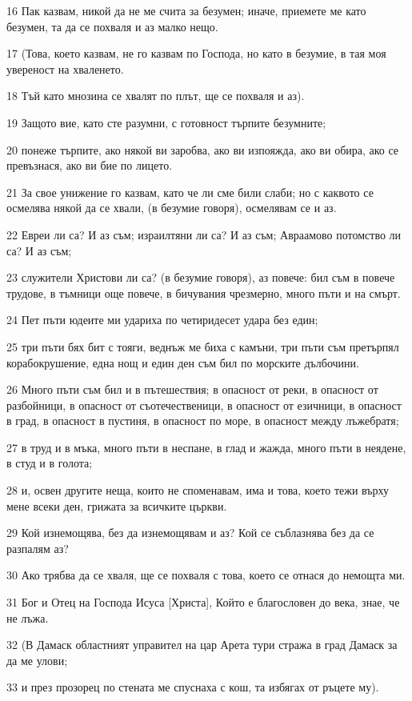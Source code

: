 \par 16 Пак казвам, никой да не ме счита за безумен; иначе, приемете ме като безумен, та да се похваля и аз малко нещо.
\par 17 (Това, което казвам, не го казвам по Господа, но като в безумие, в тая моя увереност на хваленето.
\par 18 Тъй като мнозина се хвалят по плът, ще се похваля и аз).
\par 19 Защото вие, като сте разумни, с готовност търпите безумните;
\par 20 понеже търпите, ако някой ви заробва, ако ви изпояжда, ако ви обира, ако се превъзнася, ако ви бие по лицето.
\par 21 За свое унижение го казвам, като че ли сме били слаби; но с каквото се осмелява някой да се хвали, (в безумие говоря), осмелявам се и аз.
\par 22 Евреи ли са? И аз съм; израилтяни ли са? И аз съм; Авраамово потомство ли са? И аз съм;
\par 23 служители Христови ли са? (в безумие говоря), аз повече: бил съм в повече трудове, в тъмници още повече, в бичувания чрезмерно, много пъти и на смърт.
\par 24 Пет пъти юдеите ми удариха по четиридесет удара без един;
\par 25 три пъти бях бит с тояги, веднъж ме биха с камъни, три пъти съм претърпял корабокрушение, една нощ и един ден съм бил по морските дълбочини.
\par 26 Много пъти съм бил и в пътешествия; в опасност от реки, в опасност от разбойници, в опасност от съотечественици, в опасност от езичници, в опасност в град, в опасност в пустиня, в опасност по море, в опасност между лъжебратя;
\par 27 в труд и в мъка, много пъти в неспане, в глад и жажда, много пъти в неядене, в студ и в голота;
\par 28 и, освен другите неща, които не споменавам, има и това, което тежи върху мене всеки ден, грижата за всичките църкви.
\par 29 Кой изнемощява, без да изнемощявам и аз? Кой се съблазнява без да се разпалям аз?
\par 30 Ако трябва да се хваля, ще се похваля с това, което се отнася до немощта ми.
\par 31 Бог и Отец на Господа Исуса [Христа], Който е благословен до века, знае, че не лъжа.
\par 32 (В Дамаск областният управител на цар Арета тури стража в град Дамаск за да ме улови;
\par 33 и през прозорец по стената ме спуснаха с кош, та избягах от ръцете му).

